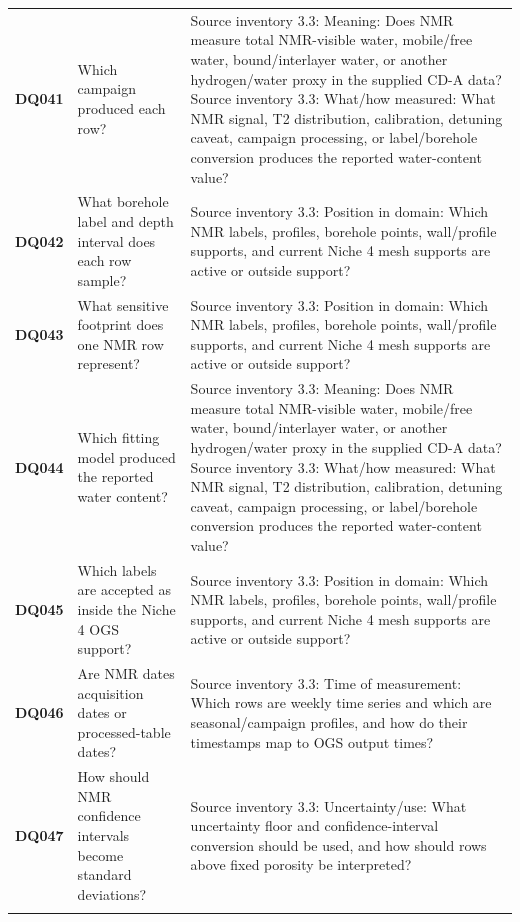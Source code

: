\begin{longtable}{@{}L{0.09\textwidth} L{0.31\textwidth} L{0.52\textwidth}@{}}
\addlinespace[0.18em]
\textbf{DQ041} & Which campaign produced each row? & Source inventory 3.3: Meaning: Does NMR measure total NMR-visible water, mobile/free water, bound/interlayer water, or another hydrogen/water proxy in the supplied CD-A data? Source inventory 3.3: What/how measured: What NMR signal, T2 distribution, calibration, detuning caveat, campaign processing, or label/borehole conversion produces the reported water-content value?\\
\addlinespace[0.18em]
\textbf{DQ042} & What borehole label and depth interval does each row sample? & Source inventory 3.3: Position in domain: Which NMR labels, profiles, borehole points, wall/profile supports, and current Niche 4 mesh supports are active or outside support?\\
\addlinespace[0.18em]
\textbf{DQ043} & What sensitive footprint does one NMR row represent? & Source inventory 3.3: Position in domain: Which NMR labels, profiles, borehole points, wall/profile supports, and current Niche 4 mesh supports are active or outside support?\\
\addlinespace[0.18em]
\textbf{DQ044} & Which fitting model produced the reported water content? & Source inventory 3.3: Meaning: Does NMR measure total NMR-visible water, mobile/free water, bound/interlayer water, or another hydrogen/water proxy in the supplied CD-A data? Source inventory 3.3: What/how measured: What NMR signal, T2 distribution, calibration, detuning caveat, campaign processing, or label/borehole conversion produces the reported water-content value?\\
\addlinespace[0.18em]
\textbf{DQ045} & Which labels are accepted as inside the Niche 4 OGS support? & Source inventory 3.3: Position in domain: Which NMR labels, profiles, borehole points, wall/profile supports, and current Niche 4 mesh supports are active or outside support?\\
\addlinespace[0.18em]
\textbf{DQ046} & Are NMR dates acquisition dates or processed-table dates? & Source inventory 3.3: Time of measurement: Which rows are weekly time series and which are seasonal/campaign profiles, and how do their timestamps map to OGS output times?\\
\addlinespace[0.18em]
\textbf{DQ047} & How should NMR confidence intervals become standard deviations? & Source inventory 3.3: Uncertainty/use: What uncertainty floor and confidence-interval conversion should be used, and how should rows above fixed porosity be interpreted?\\
\addlinespace[0.18em]

\end{longtable}
